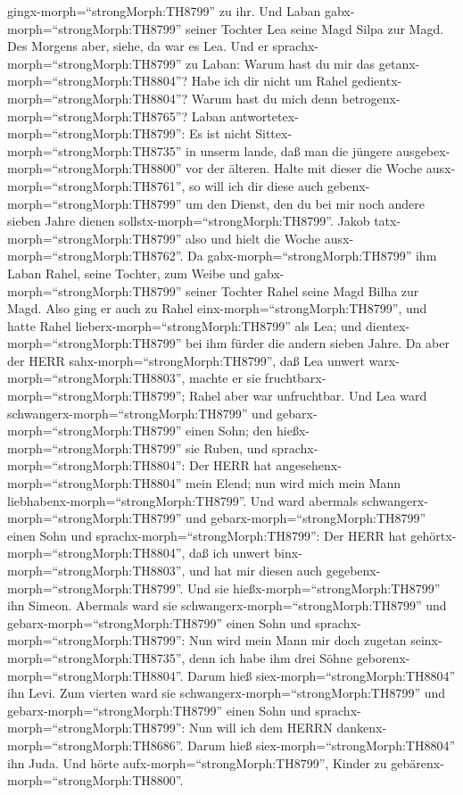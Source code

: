 gingx-morph=``strongMorph:TH8799'' zu ihr.  Und Laban
gabx-morph=``strongMorph:TH8799'' seiner Tochter Lea seine Magd Silpa
zur Magd.  Des Morgens aber, siehe, da war es Lea. Und er
sprachx-morph=``strongMorph:TH8799'' zu Laban: Warum hast du mir das
getanx-morph=``strongMorph:TH8804''? Habe ich dir nicht um Rahel
gedientx-morph=``strongMorph:TH8804''? Warum hast du mich denn
betrogenx-morph=``strongMorph:TH8765''?  Laban
antwortetex-morph=``strongMorph:TH8799'': Es ist nicht
Sittex-morph=``strongMorph:TH8735'' in unserm lande, daß man die jüngere
ausgebex-morph=``strongMorph:TH8800'' vor der älteren. 
Halte mit dieser die Woche ausx-morph=``strongMorph:TH8761'', so will
ich dir diese auch gebenx-morph=``strongMorph:TH8799'' um den Dienst,
den du bei mir noch andere sieben Jahre dienen
sollstx-morph=``strongMorph:TH8799''.  Jakob
tatx-morph=``strongMorph:TH8799'' also und hielt die Woche
ausx-morph=``strongMorph:TH8762''. Da gabx-morph=``strongMorph:TH8799''
ihm Laban Rahel, seine Tochter, zum Weibe  und
gabx-morph=``strongMorph:TH8799'' seiner Tochter Rahel seine Magd Bilha
zur Magd.  Also ging er auch zu Rahel
einx-morph=``strongMorph:TH8799'', und hatte Rahel
lieberx-morph=``strongMorph:TH8799'' als Lea; und
dientex-morph=``strongMorph:TH8799'' bei ihm fürder die andern sieben
Jahre.  Da aber der HERR sahx-morph=``strongMorph:TH8799'',
daß Lea unwert warx-morph=``strongMorph:TH8803'', machte er sie
fruchtbarx-morph=``strongMorph:TH8799''; Rahel aber war unfruchtbar.
 Und Lea ward schwangerx-morph=``strongMorph:TH8799'' und
gebarx-morph=``strongMorph:TH8799'' einen Sohn; den
hießx-morph=``strongMorph:TH8799'' sie Ruben, und
sprachx-morph=``strongMorph:TH8804'': Der HERR hat
angesehenx-morph=``strongMorph:TH8804'' mein Elend; nun wird mich mein
Mann liebhabenx-morph=``strongMorph:TH8799''.  Und ward
abermals schwangerx-morph=``strongMorph:TH8799'' und
gebarx-morph=``strongMorph:TH8799'' einen Sohn und
sprachx-morph=``strongMorph:TH8799'': Der HERR hat
gehörtx-morph=``strongMorph:TH8804'', daß ich unwert
binx-morph=``strongMorph:TH8803'', und hat mir diesen auch
gegebenx-morph=``strongMorph:TH8799''. Und sie
hießx-morph=``strongMorph:TH8799'' ihn Simeon.  Abermals
ward sie schwangerx-morph=``strongMorph:TH8799'' und
gebarx-morph=``strongMorph:TH8799'' einen Sohn und
sprachx-morph=``strongMorph:TH8799'': Nun wird mein Mann mir doch
zugetan seinx-morph=``strongMorph:TH8735'', denn ich habe ihm drei Söhne
geborenx-morph=``strongMorph:TH8804''. Darum hieß
siex-morph=``strongMorph:TH8804'' ihn Levi.  Zum vierten
ward sie schwangerx-morph=``strongMorph:TH8799'' und
gebarx-morph=``strongMorph:TH8799'' einen Sohn und
sprachx-morph=``strongMorph:TH8799'': Nun will ich dem HERRN
dankenx-morph=``strongMorph:TH8686''. Darum hieß
siex-morph=``strongMorph:TH8804'' ihn Juda. Und hörte
aufx-morph=``strongMorph:TH8799'', Kinder zu
gebärenx-morph=``strongMorph:TH8800''.

